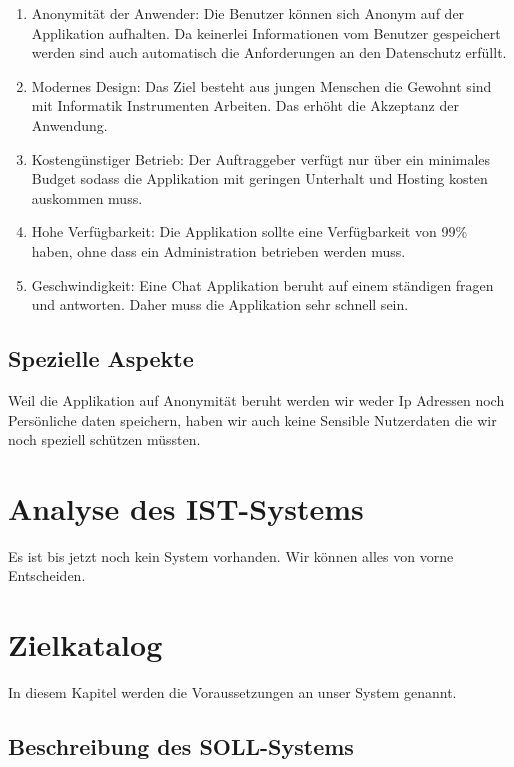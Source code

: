 \documentclass[12pt]{article}
\begin{document}
      \begin{enumerate}
        \item Anonymität der Anwender: Die Benutzer können sich Anonym auf der Applikation aufhalten.
          Da keinerlei Informationen vom Benutzer gespeichert werden sind auch automatisch
          die Anforderungen an den Datenschutz erfüllt.
        \item Modernes Design: Das Ziel besteht aus jungen Menschen die Gewohnt sind mit
          Informatik Instrumenten Arbeiten. Das erhöht die Akzeptanz der Anwendung.
        \item Kostengünstiger Betrieb: Der Auftraggeber verfügt nur über ein minimales Budget
          sodass die Applikation mit geringen Unterhalt und Hosting kosten auskommen muss.
        \item Hohe Verfügbarkeit: Die Applikation sollte eine Verfügbarkeit von 99\% haben,
          ohne dass ein Administration betrieben werden muss.
        \item Geschwindigkeit: Eine Chat Applikation beruht auf einem ständigen fragen und antworten. \newline
          Daher muss die Applikation sehr schnell sein.
      \end{enumerate}

    \subsection{Spezielle Aspekte}
      Weil die Applikation auf Anonymität beruht werden wir weder Ip Adressen noch Persönliche daten speichern,
      haben wir auch keine Sensible Nutzerdaten die wir noch speziell schützen müssten.

  \section{Analyse des IST-Systems}
    Es ist bis jetzt noch kein System vorhanden. Wir können alles von vorne Entscheiden.

  \section{Zielkatalog}
    In diesem Kapitel werden die Voraussetzungen an unser System genannt.

    \subsection{Beschreibung des SOLL-Systems}
\end{document}
